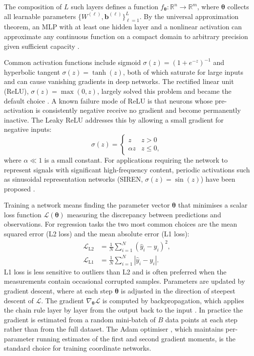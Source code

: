 \documentclass[12pt, a4paper, twoside]{report}
\begin{document}
The composition of $L$ such layers defines a function $f_{\boldsymbol{\theta}} : \mathbb{R}^{n} \to \mathbb{R}^{m}$, where $\boldsymbol{\theta}$ collects all learnable parameters $\{W^{(\ell)}, \mathbf{b}^{(\ell)}\}_{\ell=1}^{L}$. By the universal approximation theorem, an MLP with at least one hidden layer and a nonlinear activation can approximate any continuous function on a compact domain to arbitrary precision given sufficient capacity \citep{cybenko1989approximation, hornik1989multilayer}.

Common activation functions include sigmoid $\sigma(z) = (1 + e^{-z})^{-1}$ and hyperbolic tangent $\sigma(z) = \tanh(z)$, both of which saturate for large inputs and can cause vanishing gradients in deep networks. The rectified linear unit (ReLU), $\sigma(z) = \max(0, z)$, largely solved this problem and became the default choice \citep{nair2010rectified}. A known failure mode of ReLU is that neurons whose pre-activation is consistently negative receive no gradient and become permanently inactive. The Leaky ReLU addresses this by allowing a small gradient for negative inputs:
%
\begin{equation}
    \sigma(z) = \begin{cases} z & z > 0 \\ \alpha z & z \leq 0, \end{cases}
    \label{eq:leaky_relu}
\end{equation}
%
where $\alpha \ll 1$ is a small constant. For applications requiring the network to represent signals with significant high-frequency content, periodic activations such as sinusoidal representation networks (SIREN, $\sigma(z) = \sin(z)$) have been proposed \citep{sitzmann2020siren}.

Training a network means finding the parameter vector $\boldsymbol{\theta}$ that minimises a scalar loss function $\mathcal{L}(\boldsymbol{\theta})$ measuring the discrepancy between predictions and observations. For regression tasks the two most common choices are the mean squared error (L2 loss) and the mean absolute error (L1 loss):
%
\begin{align}
    \mathcal{L}_{\mathrm{L2}} &= \frac{1}{N}\sum_{i=1}^{N}\left(\hat{y}_i - y_i\right)^2,
    \label{eq:l2_loss} \\
    \mathcal{L}_{\mathrm{L1}} &= \frac{1}{N}\sum_{i=1}^{N}\left|\hat{y}_i - y_i\right|.
    \label{eq:l1_loss}
\end{align}
%
L1 loss is less sensitive to outliers than L2 and is often preferred when the measurements contain occasional corrupted samples. Parameters are updated by gradient descent, where at each step $\boldsymbol{\theta}$ is adjusted in the direction of steepest descent of $\mathcal{L}$. The gradient $\nabla_{\boldsymbol{\theta}} \mathcal{L}$ is computed by backpropagation, which applies the chain rule layer by layer from the output back to the input \citep{rumelhart1986backprop}. In practice the gradient is estimated from a random mini-batch of $B$ data points at each step rather than from the full dataset. The Adam optimiser \citep{kingma2015adam}, which maintains per-parameter running estimates of the first and second gradient moments, is the standard choice for training coordinate networks.
\end{document}
